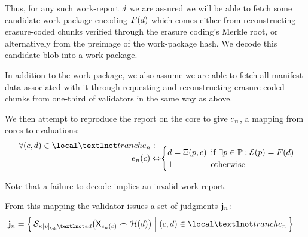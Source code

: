 Thus, for any such work-report $d$ we are assured we will be able to fetch some candidate work-package encoding $F(d)$ which comes either from reconstructing erasure-coded chunks verified through the erasure coding's Merkle root, or alternatively from the preimage of the work-package hash. We decode this candidate blob into a work-package.

In addition to the work-package, we also assume we are able to fetch all manifest data associated with it through requesting and reconstructing erasure-coded chunks from one-third of validators in the same way as above.

We then attempt to reproduce the report on the core to give $e_{n}$, a mapping from cores to evaluations: \vskip -7pt
\begin{equation}
  \begin{aligned}
    \forall (\cX, \wdX) \in \local¬tranche\sub{n} :\ \ &\\[-10pt]
    e\sub{n}(\cX) \Leftrightarrow &\begin{cases}
      \wdX = \computedigest(p, \cX)\!\!\! &\when \exists p \in \workpackage: \se(p) = F(\wdX) \\
      \bot &\otherwise
    \end{cases}
  \end{aligned}\!\!
\end{equation}

Note that a failure to decode implies an invalid work-report.

From this mapping the validator issues a set of judgments $\mathbf{j}_{n}$:
\begin{align}
  \mathbf{j}\sub{n} &= \set{\build{\Fsigndata{\activeset\subb{v}_\vk¬ed}{\mathsf{X}_{e\sub{n}(\cX)} \concat \blake(\wdX)}}{(\cX, \wdX) \in \local¬tranche\sub{n}}}
\end{align}


